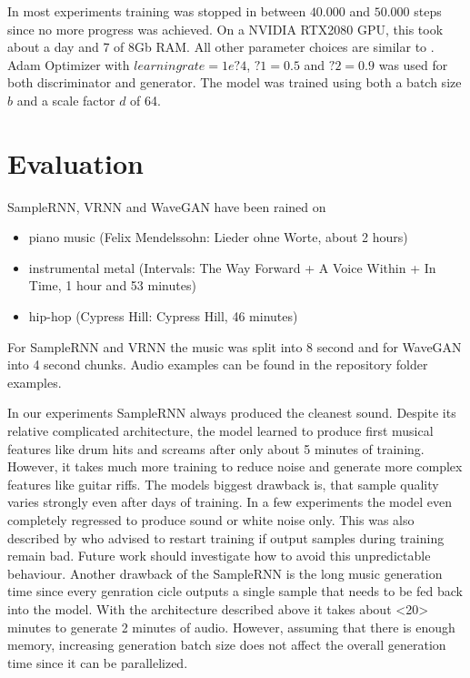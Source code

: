 \documentclass[12pt]{article}
\begin{document}
In most experiments training was stopped in between $40.000$ and $50.000$ steps since no more progress was achieved.
On a NVIDIA RTX2080 GPU, this took about a day and 7 of 8Gb RAM.
All other parameter choices are similar to \cite{donahue2018adversarial}.
Adam Optimizer with $learning rate = 1e ? 4$, $?1 = 0.5$ and $?2 = 0.9$
was used for both discriminator and generator.
The model was trained using both a batch size $b$ and a scale factor $d$ of 64.







\section{Evaluation}
SampleRNN, VRNN and WaveGAN have been rained on
\begin{itemize}
 \item piano music (Felix Mendelssohn: Lieder ohne Worte, about 2 hours)
 \item instrumental metal (Intervals: The Way Forward + A Voice Within + In Time, 1 hour and 53 minutes) %
 \item hip-hop (Cypress Hill: Cypress Hill, 46 minutes)
\end{itemize}

For SampleRNN and VRNN the music was split into 8 second and for WaveGAN into 4 second chunks.
Audio examples can be found in the repository folder examples. %



In our experiments SampleRNN always produced the cleanest sound.
Despite its relative complicated architecture, the model learned to produce first musical features like drum hits and screams after only about 5 minutes of training.
However, it takes much more training to reduce noise and generate more complex features like guitar riffs.
The models biggest drawback is, that sample quality varies strongly even after days of training.
In a few experiments the model even completely regressed to produce sound or white noise only.
This was also described by \cite{carr2018generating} who advised to restart training if output samples during training remain bad.
Future work should investigate how to avoid this unpredictable behaviour.
Another drawback of the SampleRNN is the long music generation time since every genration cicle outputs a single sample that needs to be fed back into the model.
With the architecture described above it takes about <20> minutes to generate 2 minutes of audio. %
However, assuming that there is enough memory, increasing generation batch size does not affect the overall generation time since it can be parallelized.
\end{document}
